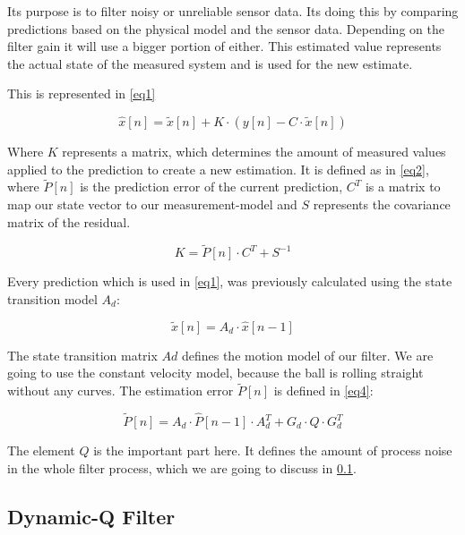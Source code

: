 \documentclass[notitlepage, a4paper, 11pt]{scrartcl}
\begin{document}
\begin{multicols}{2}
Its purpose is to filter noisy or unreliable sensor data. 
Its doing this by comparing predictions based on the physical model and the sensor data. 
Depending on the filter gain it will use a bigger portion of either. 
This estimated value represents the actual state of the measured system and is used for the new estimate.

This is represented in \cref{eq1}

\begin{equation} 
    \label{eq1}
    \hat{x}[n]=\tilde{x}[n]+K\cdot(y[n]-C\cdot\tilde{x}[n])
\end{equation}

Where $K$ represents a matrix, which determines the amount of measured values applied to the prediction to create a new estimation. It is defined as in \cref{eq2}, 
where $\tilde{P}[n]$ is the prediction error of the current prediction, $C^T$ is a matrix to map our state vector to our measurement-model and $S$ represents the covariance matrix of the residual.

\begin{equation} 
    \label{eq2}
    K=\tilde{P}[n]\cdot C^T+S^{-1}
\end{equation}

Every prediction which is used in \cref{eq1}, was previously calculated using the state transition model $A_d$:

\begin{equation} 
    \label{eq3}
    \tilde{x}[n]=A_d\cdot\hat{x}[n-1]
\end{equation}

The state transition matrix $Ad$ defines the motion model of our filter.
We are going to use the constant velocity model, because the ball is rolling straight without any curves.
The estimation error $\tilde{P}[n]$ is defined in \cref{eq4}:

\begin{equation} 
    \label{eq4}
    \tilde{P}[n]=A_d\cdot\hat{P}[n-1]\cdot A_d^T+G_d\cdot Q\cdot G_d^T
\end{equation}

The element $Q$ is the important part here. It defines the amount of process noise in the whole filter process, which we are going to discuss in \cref{dynamic-q}.

\subsection{Dynamic-Q Filter} \label{dynamic-q}


\end{multicols}
\end{document}
